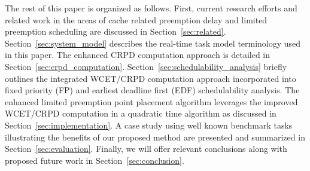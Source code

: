 The rest of this paper is organized as follows. First, current research efforts and related work in the areas of cache related preemption delay and limited preemption scheduling are discussed in Section~\ref{sec:related}.  Section~\ref{sec:system_model} describes the real-time task model terminology used in this paper.  The enhanced CRPD computation approach is detailed in Section~\ref{sec:crpd_computation}. Section~\ref{sec:schedulability_analysis} briefly outlines the integrated WCET/CRPD computation approach incorporated into fixed priority (FP) and earliest deadline first (EDF) schedulability analysis.  The enhanced limited preemption point placement algorithm leverages the improved WCET/CRPD computation in a quadratic time algorithm as discussed in Section~\ref{sec:implementation}.  A case study using well known benchmark tasks illustrating the benefits of our proposed method are presented and summarized in Section~\ref{sec:evaluation}.  Finally, we will offer relevant conclusions along with proposed future work in Section~\ref{sec:conclusion}. 